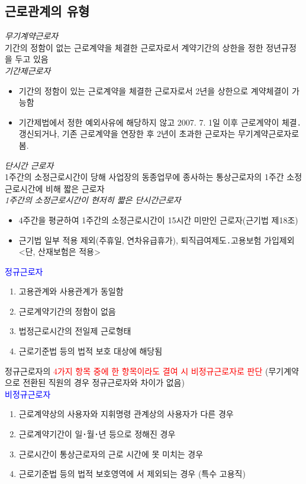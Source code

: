\subsection{근로관계의 유형}
\emph{무기계약근로자}\\
기간의 정함이 없는 근로계약을 체결한 근로자로서 계약기간의 상한을 정한 정년규정을 두고 있음\\
\emph{기간제근로자}
\begin{itemize}\tightlist
\item 기간의 정함이 있는 근로계약을 체결한 근로자로서 2년을 상한으로 계약체결이 가능함
\item 기간제법에서 정한 예외사유에 해당하지 않고 2007. 7. 1일 이후 근로계약이 체결․갱신되거나, 
     기존 근로계약을 연장한 후 2년이 초과한 근로자는 무기계약근로자로 봄.
\end{itemize}
\emph{단시간 근로자}\\
1주간의 소정근로시간이 당해 사업장의 동종업무에 종사하는 통상근로자의 1주간 
   소정근로시간에 비해 짧은 근로자\\
\emph{1주간의 소정근로시간이 현저히 짧은 단시간근로자}
\begin{itemize}\tightlist
\item  4주간을 평균하여 1주간의 소정근로시간이 15시간 미만인 근로자(근기법 제18조)
\item 근기법 일부 적용 제외(주휴일, 연차유급휴가), 퇴직급여제도․고용보험 가입제외 
    <단, 산재보험은 적용>   
\end{itemize}
\textcolor{blue}{정규근로자}
\begin{enumerate}[❶]\tightlist
\item 고용관계와 사용관계가 동일함
\item 근로계약기간의 정함이 없음
\item 법정근로시간의 전일제 근로형태
\item 근로기준법 등의 법적 보호   대상에 해당됨   
\end{enumerate}
정규근로자의 \textcolor{red}{4가지 항목 중에 한 항목이라도 결여 시 비정규근로자로 판단}
       (무기계약으로 전환된 직원의 경우 정규근로자와 차이가 없음)   \\
\textcolor{blue}{비정규근로자}   
\begin{enumerate}[❶]\tightlist
\item 근로계약상의 사용자와 지휘명령  관계상의  사용자가 다른 경우
\item 근로계약기간이 일･월･년 등으로  정해진 경우
\item 근로시간이 통상근로자의 근로 시간에 못  미치는 경우
\item 근로기준법 등의 법적 보호영역에 서 제외되는  경우 (특수 고용직)  
\end{enumerate}
